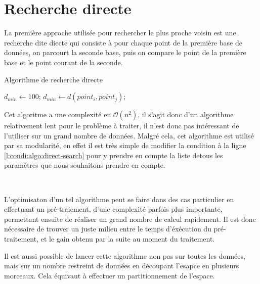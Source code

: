 \section{Recherche directe}

La première approche utilisée pour rechercher le plus proche voisin est une recherche dite diecte qui consiste à pour chaque point de la première base de données, on parcourt la seconde base, puis on compare le point de la première base et le point courant de la seconde.

	\begin{algorithm}
		\caption{Algorithme de recherche directe}
		\label{algo:direct-search}
		\begin{algorithmic}[1]
			\State $d_{min} \gets 100$; 
					  \label{l:condi:algo:direct-search}
						\State $d_{min} \gets d(point_i , point_j)$;
					\EndIf
				\EndFor
			\EndFor
		\end{algorithmic}
	\end{algorithm}

Cet algoritme a une complexité en $\mathcal{O}(n^{2})$, il s'agit donc d'un algorithme relativement lent pour le problème à traiter, il n'est donc pas intéressant de l'utiliser sur un grand nombre de données. Malgré cela, cet algorithme est utilisé par sa modularité, en effet il est très simple de modifier la condition à la ligne \ref{l:condi:algo:direct-search} pour y prendre en compte la liste detous les paramètres que nous souhaitons prendre en compte.

\

L'optimisaton d'un tel algorithme peut se faire dans des cas particulier en effectuant un pré-traiement, d'une complexité parfois plus importante, permettant ensuite de réaliser un grand nombre de calcul rapidement. Il est donc nécessaire de trouver un juste milieu entre le temps d'éxécution du pré-traitement, et le gain obtenu par la suite au moment du traitement.

Il est aussi possible de lancer cette algorithme non pas sur toutes les données, mais sur un nombre restreint de données en découpant l'esapce en plusieurs morceaux. Cela équivaut à effectuer un partitionnement de l'espace.


